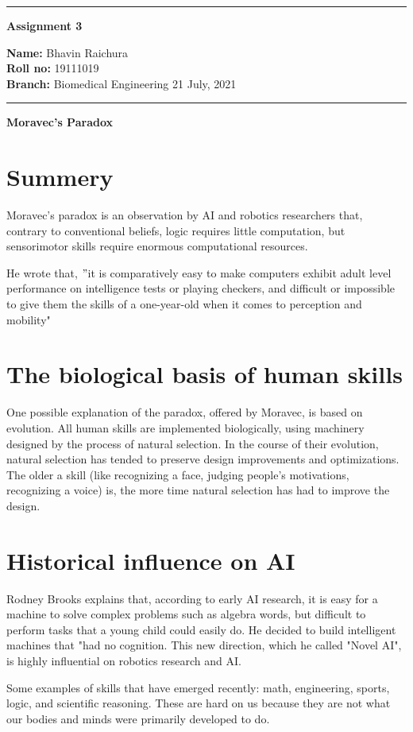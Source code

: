 \documentclass[10pt,a4paper,twoside]{article}
\begin{document}
\begin{center}
\hrule

\vspace{.3cm}
{\bf {\huge Assignment 3}}
\vspace{.3cm}
\end{center}
{\bf Name:}  Bhavin Raichura\\
{\bf Roll no:}  19111019 \\
{\bf Branch: }  Biomedical Engineering \hspace{\fill}  21 July, 2021 \\
\hrule

\vspace{.5cm}
\vspace{.4cm}
{\bf {\Large Moravec's Paradox }}\\
\section{Summery}
Moravec's paradox is an observation by AI and robotics researchers that, contrary to conventional beliefs, logic requires little computation, but sensorimotor skills require enormous computational resources.

\item He wrote that, 
$"$it is comparatively easy to make computers exhibit adult level performance on intelligence tests or playing checkers, and difficult or impossible to give them the skills of a one-year-old when it comes to perception and mobility"

\section{The biological basis of human skills}
One possible explanation of the paradox, offered by Moravec, is based on evolution. All human skills are implemented biologically, using machinery designed by the process of natural selection. In the course of their evolution, natural selection has tended to preserve design improvements and optimizations. The older a skill (like recognizing a face, judging people's motivations, recognizing a voice) is, the more time natural selection has had to improve the design.



\section{Historical influence on AI}
Rodney Brooks explains that, according to early AI research, it is easy for a machine to solve complex problems such as algebra words, but difficult to perform tasks that a young child could easily do.
He decided to build intelligent machines that "had no cognition. This new direction, which he called "Novel AI", is highly influential on robotics research and AI.
\item Some examples of skills that have emerged recently: math, engineering, sports, logic, and scientific reasoning. These are hard on us because they are not what our bodies and minds were primarily developed to do.
\end{document}
